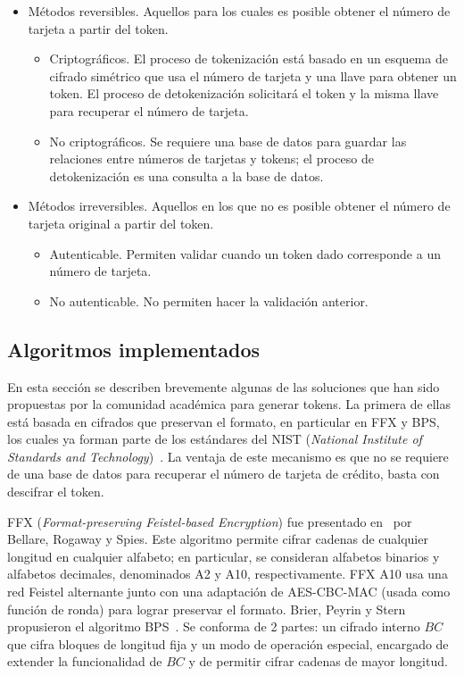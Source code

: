 \documentclass[conference]{IEEEtran}
\begin{document}
  \begin{itemize}
    \item Métodos reversibles. Aquellos para los cuales es posible obtener el
      número de tarjeta a partir del token.
      \begin{itemize}
        \item Criptográficos. El proceso de tokenización está basado en un
          esquema de cifrado simétrico que usa el número de tarjeta y una llave
          para obtener un token. El proceso de detokenización solicitará el
          token y la misma llave para recuperar el número de tarjeta.
        \item No criptográficos. Se requiere una base de datos para guardar las
          relaciones entre números de tarjetas y tokens; el proceso de
          detokenización es una consulta a la base de datos.
      \end{itemize}
    \item Métodos irreversibles. Aquellos en los que no es posible obtener el
      número de tarjeta original a partir del token.
      \begin{itemize}
        \item Autenticable. Permiten validar cuando un token dado corresponde a
          un número de tarjeta.
        \item No autenticable. No permiten hacer la validación anterior.
      \end{itemize}
  \end{itemize}

  \subsection{Algoritmos implementados}
  \label{sec:implementaciones}

  En esta sección se describen brevemente algunas de las soluciones que han sido
  propuestas por la comunidad académica para generar tokens. La primera de ellas
  está basada en cifrados que preservan el formato, en particular en FFX y BPS,
  los cuales ya forman parte de los estándares del NIST (\textit{National
  Institute of Standards and Technology})~\cite{nist_fpe}. La ventaja de este
  mecanismo es que no se requiere de una base de datos para recuperar el número
  de tarjeta de crédito, basta con descifrar el token.

  FFX (\textit{Format-preserving Feistel-based Encryption}) fue presentado
  en~\cite{ffx_1} por Bellare, Rogaway y Spies. Este algoritmo permite cifrar
  cadenas de cualquier longitud en cualquier alfabeto; en particular, se
  consideran alfabetos binarios y alfabetos decimales, denominados A2 y A10,
  respectivamente. FFX A10 usa una red Feistel alternante junto con una
  adaptación de AES-CBC-MAC (usada como función de ronda) para lograr preservar
  el formato. Brier, Peyrin y Stern propusieron el algoritmo BPS~\cite{bps}. Se
  conforma de 2 partes: un cifrado interno $BC$ que cifra bloques de longitud
  fija y un modo de operación especial, encargado de extender la funcionalidad
  de $BC$ y de permitir cifrar cadenas de mayor longitud.
\end{document}

